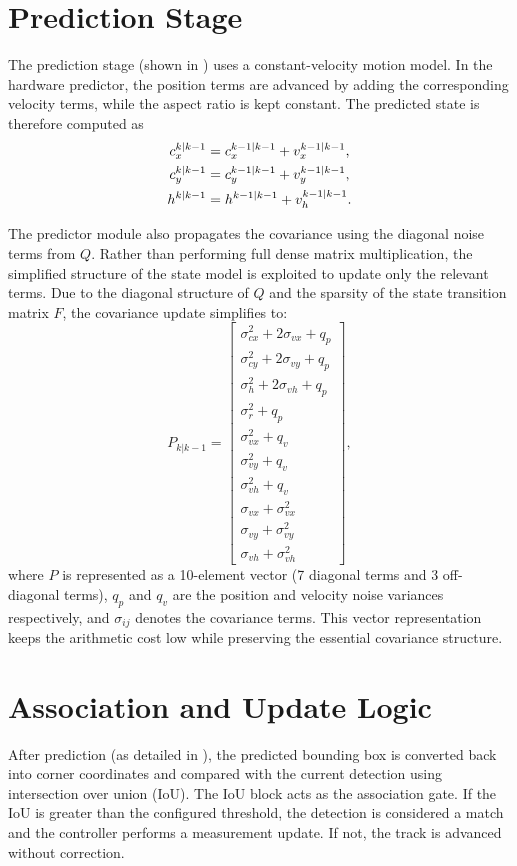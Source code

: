 \section{Prediction Stage}
The prediction stage (shown in ) uses a constant-velocity motion model. In the hardware predictor, 
the position terms are advanced by adding the corresponding velocity terms, while 
the aspect ratio is kept constant. The predicted state is therefore computed as
\begin{align}
	c_x^{k|k-1} &= c_x^{k-1|k-1} + v_x^{k-1|k-1}, \notag \\
	c_y^{k|k-1} &= c_y^{k-1|k-1} + v_y^{k-1|k-1}, \notag \\
	h^{k|k-1} &= h^{k-1|k-1} + v_h^{k-1|k-1}. \notag
\end{align}

The predictor module also propagates the covariance using the diagonal noise terms 
from $Q$. Rather than performing full dense matrix multiplication, the simplified 
structure of the state model is exploited to update only the relevant terms. Due to 
the diagonal structure of $Q$ and the sparsity of the state transition matrix $F$, 
the covariance update simplifies to:
\begin{equation}
	P_{k|k-1} = \begin{bmatrix}
		\sigma^2_{cx} + 2\sigma_{vx} + q_p \\
		\sigma^2_{cy} + 2\sigma_{vy} + q_p \\
		\sigma^2_h + 2\sigma_{vh} + q_p \\
		\sigma^2_r + q_p \\
		\sigma^2_{vx} + q_v \\
		\sigma^2_{vy} + q_v \\
		\sigma^2_{vh} + q_v \\
		\sigma_{vx} + \sigma^2_{vx} \\
		\sigma_{vy} + \sigma^2_{vy} \\
		\sigma_{vh} + \sigma^2_{vh}
	\end{bmatrix},
\end{equation}
where $P$ is represented as a 10-element vector (7 diagonal terms and 3 off-diagonal 
terms), $q_p$ and $q_v$ are the position and velocity noise variances respectively, 
and $\sigma_{ij}$ denotes the covariance terms. This vector representation keeps the 
arithmetic cost low while preserving the essential covariance structure.

\section{Association and Update Logic}
After prediction (as detailed in ), the predicted bounding box is converted back into corner coordinates 
and compared with the current detection using intersection over union (IoU). The IoU 
block acts as the association gate. If the IoU is greater than the configured threshold, 
the detection is considered a match and the controller performs a measurement update. If 
not, the track is advanced without correction.


